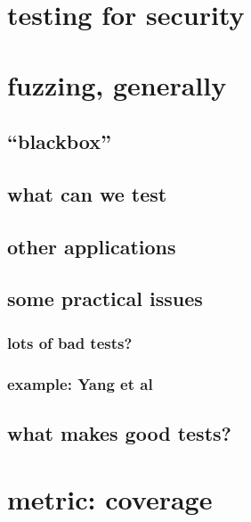 

\section{testing for security}


\section{fuzzing, generally}


\subsection{``blackbox''}


\subsection{what can we test}


\subsection{other applications}


\subsection{some practical issues}


\subsubsection{lots of bad tests?}


\subsubsection{example: Yang et al}


\subsection{what makes good tests?} %


\section{metric: coverage}


